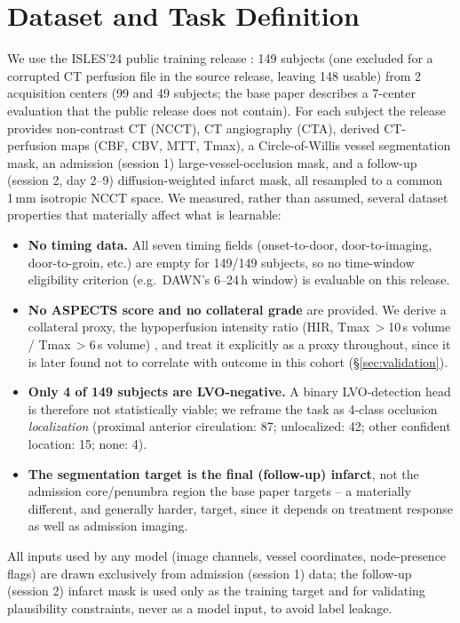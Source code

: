 \documentclass[conference]{IEEEtran}
\begin{document}
\section{Dataset and Task Definition}

We use the ISLES'24 public training release \cite{isles2024}: 149 subjects (one excluded for a corrupted CT perfusion file in the source release, leaving 148 usable) from 2 acquisition centers (99 and 49 subjects; the base paper describes a 7-center evaluation that the public release does not contain). For each subject the release provides non-contrast CT (NCCT), CT angiography (CTA), derived CT-perfusion maps (CBF, CBV, MTT, Tmax), a Circle-of-Willis vessel segmentation mask, an admission (session 1) large-vessel-occlusion mask, and a follow-up (session 2, day 2--9) diffusion-weighted infarct mask, all resampled to a common 1\,mm isotropic NCCT space. We measured, rather than assumed, several dataset properties that materially affect what is learnable:

\begin{itemize}
\item \textbf{No timing data.} All seven timing fields (onset-to-door, door-to-imaging, door-to-groin, etc.) are empty for 149/149 subjects, so no time-window eligibility criterion (e.g.\ DAWN's 6--24\,h window) is evaluable on this release.
\item \textbf{No ASPECTS score and no collateral grade} are provided. We derive a collateral proxy, the hypoperfusion intensity ratio (HIR, Tmax\,$>$10\,s volume / Tmax\,$>$6\,s volume) \cite{olivot2014}, and treat it explicitly as a proxy throughout, since it is later found not to correlate with outcome in this cohort (\S\ref{sec:validation}).
\item \textbf{Only 4 of 149 subjects are LVO-negative.} A binary LVO-detection head is therefore not statistically viable; we reframe the task as 4-class occlusion \emph{localization} (proximal anterior circulation: 87; unlocalized: 42; other confident location: 15; none: 4).
\item \textbf{The segmentation target is the final (follow-up) infarct}, not the admission core/penumbra region the base paper targets -- a materially different, and generally harder, target, since it depends on treatment response as well as admission imaging.
\end{itemize}

All inputs used by any model (image channels, vessel coordinates, node-presence flags) are drawn exclusively from admission (session 1) data; the follow-up (session 2) infarct mask is used only as the training target and for validating plausibility constraints, never as a model input, to avoid label leakage.
\end{document}
